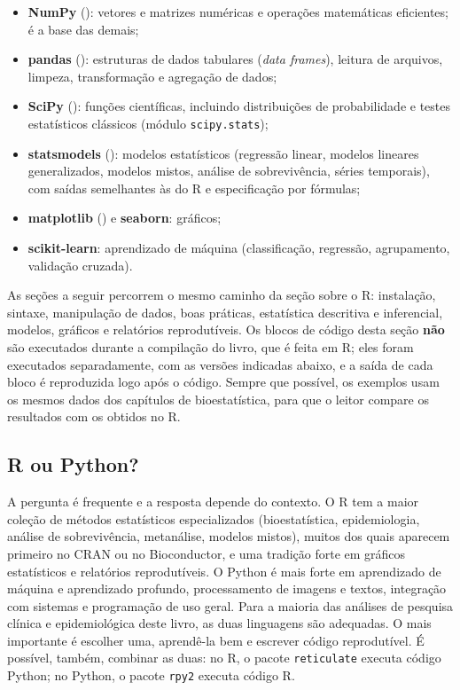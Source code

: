 \documentclass[
]{book}
\providecommand{\tightlist}{%
  \setlength{\itemsep}{0pt}\setlength{\parskip}{0pt}}
\begin{document}
\begin{itemize}
\tightlist
\item
  \textbf{NumPy} (): vetores e matrizes numéricas e operações matemáticas eficientes; é a base das demais;
\item
  \textbf{pandas} (): estruturas de dados tabulares (\emph{data frames}), leitura de arquivos, limpeza, transformação e agregação de dados;
\item
  \textbf{SciPy} (): funções científicas, incluindo distribuições de probabilidade e testes estatísticos clássicos (módulo \texttt{scipy.stats});
\item
  \textbf{statsmodels} (): modelos estatísticos (regressão linear, modelos lineares generalizados, modelos mistos, análise de sobrevivência, séries temporais), com saídas semelhantes às do R e especificação por fórmulas;
\item
  \textbf{matplotlib} () e \textbf{seaborn}: gráficos;
\item
  \textbf{scikit-learn}: aprendizado de máquina (classificação, regressão, agrupamento, validação cruzada).
\end{itemize}

As seções a seguir percorrem o mesmo caminho da seção sobre o R: instalação, sintaxe, manipulação de dados, boas práticas, estatística descritiva e inferencial, modelos, gráficos e relatórios reprodutíveis. Os blocos de código desta seção \textbf{não} são executados durante a compilação do livro, que é feita em R; eles foram executados separadamente, com as versões indicadas abaixo, e a saída de cada bloco é reproduzida logo após o código. Sempre que possível, os exemplos usam os mesmos dados dos capítulos de bioestatística, para que o leitor compare os resultados com os obtidos no R.

\subsection{R ou Python?}\label{r-ou-python}

A pergunta é frequente e a resposta depende do contexto. O R tem a maior coleção de métodos estatísticos especializados (bioestatística, epidemiologia, análise de sobrevivência, metanálise, modelos mistos), muitos dos quais aparecem primeiro no CRAN ou no Bioconductor, e uma tradição forte em gráficos estatísticos e relatórios reprodutíveis. O Python é mais forte em aprendizado de máquina e aprendizado profundo, processamento de imagens e textos, integração com sistemas e programação de uso geral. Para a maioria das análises de pesquisa clínica e epidemiológica deste livro, as duas linguagens são adequadas. O mais importante é escolher uma, aprendê-la bem e escrever código reprodutível. É possível, também, combinar as duas: no R, o pacote \texttt{reticulate} executa código Python; no Python, o pacote \texttt{rpy2} executa código R.
\end{document}
